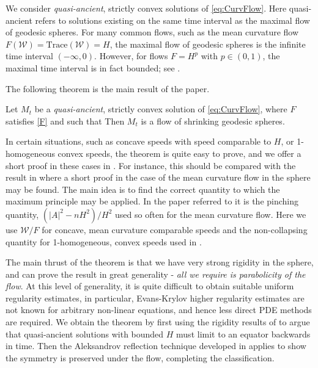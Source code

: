 \documentclass{amsart}
\begin{document}
We consider \emph{quasi-ancient}, strictly convex solutions of \eqref{eq:CurvFlow}. Here quasi-ancient refers to solutions existing on the same time interval as the maximal flow of geodesic spheres. For many common flows, such as the mean curvature flow \(F(\mathcal{W}) = \text{Trace}(\mathcal{W}) = H\), the maximal flow of geodesic spheres is the infinite time interval \((-\infty, 0)\). However, for flows \(F = H^p\) with \(p \in (0,1)\), the maximal time interval is in fact bounded; see .

The following theorem is the main result of the paper.
\begin{thm}
Let \(M_t\) be a \emph{quasi-ancient}, strictly convex solution of \eqref{eq:CurvFlow}, where $F$ satisfies \cref{F} and such that
 Then \(M_t\) is a flow of shrinking geodesic spheres.
\end{thm}
In certain situations, such as concave speeds with speed comparable to \(H\), or 1-homogeneous convex speeds, the theorem is quite easy to prove, and we offer a short proof in these cases in . For instance, this should be compared with the result in \cite[Theorem 6.1]{HuiskenSinestrari:10/2015} where a short proof in the case of the mean curvature flow in the sphere may be found. The main idea is to find the correct quantity to which the maximum principle may be applied. In the paper referred to it is the pinching quantity, \((|A|^2 - n H^2)/H^2\) used so often for the mean curvature flow. Here we use \(\mathcal{W}/F\) for concave, mean curvature comparable speeds and the non-collapsing quantity for 1-homogeneous, convex speeds used in \cite{AndrewsHanLiWei:/2015}.

The main thrust of the theorem is that we have very strong rigidity in the sphere, and can prove the result in great generality - \emph{all we require is parabolicity of the flow}. At this level of generality, it is quite difficult to obtain suitable uniform regularity estimates, in particular, Evans-Krylov higher regularity estimates are not known for arbitrary non-linear equations, and hence less direct PDE methods are required. We obtain the theorem by first using the rigidity results of \cite{MakowskiScheuer:/2013} to argue that quasi-ancient solutions with bounded \(H\) must limit to an equator backwards in time. Then the Aleksandrov reflection technique developed in \cite{BryanIvaki:08/2015,BryanLouie:04/2016} applies to show the symmetry is preserved under the flow, completing the classification.
\end{document}
